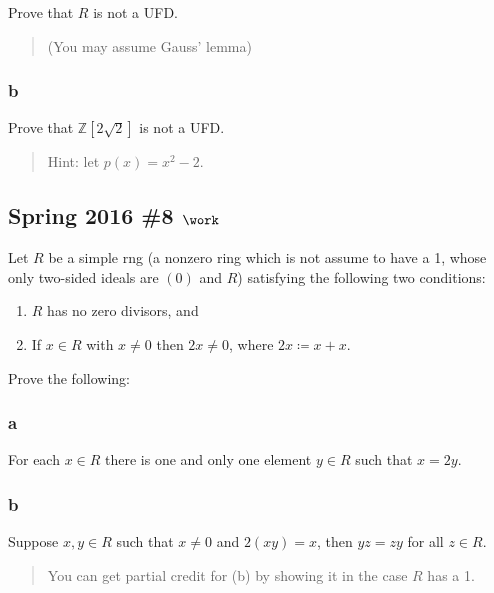 Prove that \(R\) is not a UFD.

\begin{quote}
(You may assume Gauss' lemma)
\end{quote}

\hypertarget{b-33}{%
\subsubsection{b}\label{b-33}}

Prove that \({\mathbb{Z}}[2\sqrt{2}]\) is not a UFD.

\begin{quote}
Hint: let \(p(x) = x^2-2\).
\end{quote}

\hypertarget{spring-2016-8-work}{%
\subsection{\texorpdfstring{Spring 2016 \#8
\(\work\)}{Spring 2016 \#8 \textbackslash work}}\label{spring-2016-8-work}}

Let \(R\) be a simple rng (a nonzero ring which is not assume to have a
1, whose only two-sided ideals are \((0)\) and \(R\)) satisfying the
following two conditions:

\begin{enumerate}
\def\labelenumi{\roman{enumi}.}
\tightlist
\item
  \(R\) has no zero divisors, and
\item
  If \(x\in R\) with \(x\neq 0\) then \(2x\neq 0\), where
  \(2x\coloneqq x+x\).
\end{enumerate}

Prove the following:

\hypertarget{a-44}{%
\subsubsection{a}\label{a-44}}

For each \(x\in R\) there is one and only one element \(y\in R\) such
that \(x = 2y\).

\hypertarget{b-34}{%
\subsubsection{b}\label{b-34}}

Suppose \(x,y\in R\) such that \(x\neq 0\) and \(2(xy) = x\), then
\(yz = zy\) for all \(z\in R\).

\begin{quote}
You can get partial credit for (b) by showing it in the case \(R\) has a
1.
\end{quote}

